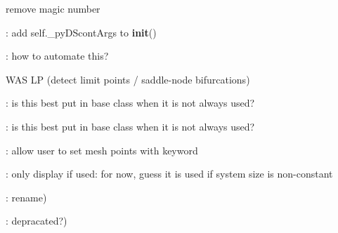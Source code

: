 \begin{DoxyRefList}
remove magic number  
\item[\label{todo__todo000047}%
\Hypertarget{todo__todo000047}%
Global \hyperlink{class_mu_mo_t_1_1_mu_mo_t_1_1_mu_mo_tbifurcation_view_aa56e2cffc879be68fdec55f29334415c}{Mu\+Mo\+Tbifurcation\+View.\+\_\+py\+D\+Scont\+Args} ]\+: add self.\+\_\+py\+D\+Scont\+Args to {\bfseries init}()  
\item[\label{todo__todo000048}%
\Hypertarget{todo__todo000048}%
Global \hyperlink{class_mu_mo_t_1_1_mu_mo_t_1_1_mu_mo_tbifurcation_view_a0a7557ffe670b6a318afa8bd9851d2fc}{Mu\+Mo\+Tbifurcation\+View.Max\+Step\+Size} ]\+: how to automate this?  
\item[\label{todo__todo000049}%
\Hypertarget{todo__todo000049}%
Global \hyperlink{class_mu_mo_t_1_1_mu_mo_t_1_1_mu_mo_tbifurcation_view_a040a7ecbcbaca807aeaec6d5c81801d5}{Mu\+Mo\+Tbifurcation\+View.Save\+Eigen} ]W\+AS \textquotesingle{}LP\textquotesingle{} (detect limit points / saddle-\/node bifurcations)  
\item[\label{todo__todo000023}%
\Hypertarget{todo__todo000023}%
Global \hyperlink{class_mu_mo_t_1_1_mu_mo_t_1_1_mu_mo_tcontroller_a018864aa22d2adb0d3958fb0adbce8e2}{Mu\+Mo\+Tcontroller.\+\_\+progress\+Bar} ]\+: is this best put in base class when it is not always used?  
\item[\label{todo__todo000024}%
\Hypertarget{todo__todo000024}%
Global \hyperlink{class_mu_mo_t_1_1_mu_mo_t_1_1_mu_mo_tcontroller_a1da52cde6b2b94a1005eaa6898d2f8c5}{Mu\+Mo\+Tcontroller.\+\_\+progress\+Bar\+\_\+multi} ]\+: is this best put in base class when it is not always used?  
\item[\label{todo__todo000037}%
\Hypertarget{todo__todo000037}%
Global \hyperlink{class_mu_mo_t_1_1_mu_mo_t_1_1_mu_mo_tfield_view_a0f5fba57766067c941f5a96b22545ed4}{Mu\+Mo\+Tfield\+View.\+\_\+\+Xdot} ]\+: allow user to set mesh points with keyword  
\item[\label{todo__todo000009}%
\Hypertarget{todo__todo000009}%
Global \hyperlink{class_mu_mo_t_1_1_mu_mo_t_1_1_mu_mo_tmodel_aaabcff4440dc0ded9f9f880c9f86c6c1}{Mu\+Mo\+Tmodel.\+\_\+dot} ]\+: only display if used\+: for now, guess it is used if system size is non-\/constant  
\item[\label{todo__todo000006}%
\Hypertarget{todo__todo000006}%
Global \hyperlink{class_mu_mo_t_1_1_mu_mo_t_1_1_mu_mo_tmodel_a795ce014c05817c0ac931270e961020f}{Mu\+Mo\+Tmodel.\+\_\+rates\+La\+TeX} ]\+: rename)  
\item[\label{todo__todo000005}%
\Hypertarget{todo__todo000005}%
Global \hyperlink{class_mu_mo_t_1_1_mu_mo_t_1_1_mu_mo_tmodel_accfd4bbcd94ec3ce4a064fec53921700}{Mu\+Mo\+Tmodel.\+\_\+reactants\+La\+TeX} ]\+: depracated?)  

\end{DoxyRefList}
